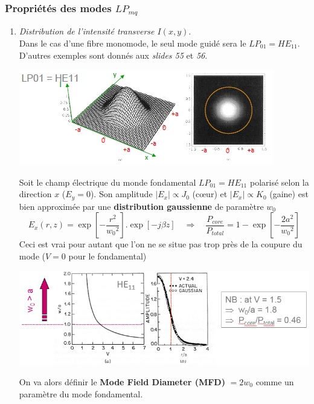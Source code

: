 \subsubsection{Propriétés des modes $LP_{mq}$}
\begin{enumerate}
\item \textit{Distribution de l'intensité transverse $I(x,y)$}.\\
Dans le cas d'une fibre monomode, le seul mode guidé sera le $LP_{01} = HE_{11}$. D'autres exemples
sont donnés aux \textit{slides 55} et \textit{56}.
\begin{center}
	\includegraphics[scale=0.65]{ch1/image24}
\end{center}
Soit le champ électrique du monde fondamental $LP_{01} = HE_{11}$ polarisé selon la direction 
$x$ ($E_y=0$). Son amplitude $|E_x|\propto J_0$ (cœur) et $|E_x|\propto K_0$ (gaine) est bien
approximée par une \textbf{distribution gaussienne} de paramètre $w_0$
\begin{equation}
{E_x}(r,z) = \exp [ - \frac{{{r^2}}}{{{w_0}^2}}].\exp [ - j\beta z]\quad\Rightarrow\quad
\frac{{{P_{core}}}}{{{P_{total}}}} = 1 - \exp [ - \frac{{2{a^2}}}{{{w_0}^2}}]
\end{equation}
Ceci est vrai pour autant que l'on ne se situe pas trop près de la coupure du mode ($V=0$ pour
le fondamental)
\newpage
\begin{center}
	\includegraphics[scale=0.55]{ch1/image25}
\end{center}
On va alors définir le \textbf{Mode Field Diameter (MFD)} $=2w_0$ comme un paramètre du mode
fondamental.\\


\end{enumerate}
